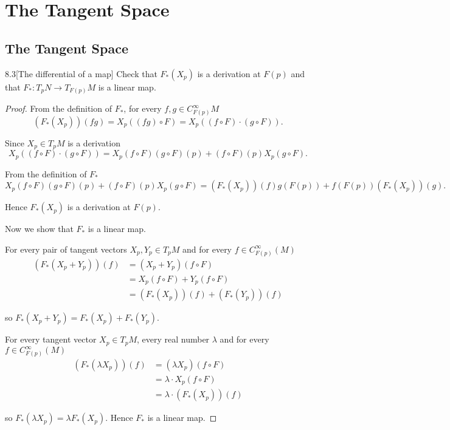 \chapter{The Tangent Space}

\section{The Tangent Space}

\begin{exercise}{8.3}[The differential of a map]
	Check that \( F_{\ast}(X_{p}) \) is a derivation at \( F(p) \) and that \( F_{\ast}: T_{p}N \to T_{F(p)}M \) is a linear map.
\end{exercise}

\begin{proof}
	From the definition of \( F_{\ast} \), for every \( f, g \in C^{\infty}_{F(p)}M \)
	\[
		(F_{\ast}(X_{p}))(fg) = X_{p}((fg) \circ F) = X_{p}((f \circ F) \cdot (g \circ F)).
	\]

	Since \( X_{p} \in T_{p}M \) is a derivation
	\[
		X_{p}((f \circ F) \cdot (g \circ F)) = X_{p}(f \circ F) (g\circ F)(p) + (f\circ F)(p) X_{p}(g\circ F).
	\]

	From the definition of \( F_{\ast} \)
	\[
		X_{p}(f \circ F) (g\circ F)(p) + (f\circ F)(p) X_{p}(g\circ F) = (F_{\ast}(X_{p}))(f) g(F(p)) + f(F(p)) (F_{\ast}(X_{p}))(g).
	\]

	Hence \( F_{\ast}(X_{p}) \) is a derivation at \( F(p) \).

	Now we show that \( F_{\ast} \) is a linear map.

	For every pair of tangent vectors \( X_{p}, Y_{p} \in T_{p}M \) and for every \( f \in C^{\infty}_{F(p)}(M) \)
	\begingroup
	\allowdisplaybreaks%
	\begin{align*}
		(F_{\ast}(X_{p} + Y_{p}))(f) & = (X_{p} + Y_{p})(f \circ F)                  \\
		                             & = X_{p}(f\circ F) + Y_{p}(f\circ F)           \\
		                             & = (F_{\ast}(X_{p}))(f) + (F_{\ast}(Y_{p}))(f)
	\end{align*}
	\endgroup

	so \( F_{\ast}(X_{p} + Y_{p}) = F_{\ast}(X_{p}) + F_{\ast}(Y_{p}) \).

	For every tangent vector \( X_{p} \in T_{p}M \), every real number \( \lambda \) and for every \( f \in C^{\infty}_{F(p)}(M) \)
	\begingroup
	\allowdisplaybreaks%
	\begin{align*}
		(F_{\ast}(\lambda X_{p}))(f) & = (\lambda X_{p})(f \circ F)         \\
		                             & = \lambda \cdot X_{p}(f \circ F)     \\
		                             & = \lambda \cdot (F_{\ast}(X_{p}))(f)
	\end{align*}
	\endgroup

	so \( F_{\ast}(\lambda X_{p}) = \lambda F_{\ast}(X_{p}) \). Hence \( F_{\ast} \) is a linear map.
\end{proof}

